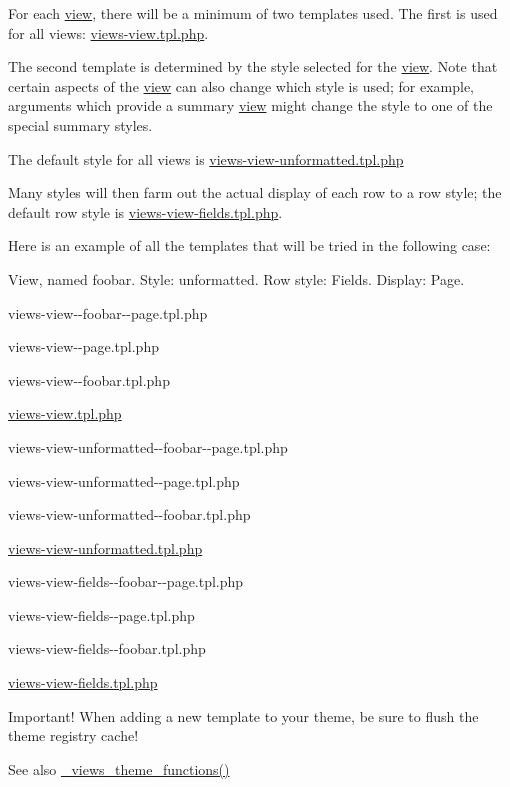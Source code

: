 For each \hyperlink{classview}{view}, there will be a minimum of two templates used. The first is used for all views: \hyperlink{views-view_8tpl_8php}{views-\/view.tpl.php}.

The second template is determined by the style selected for the \hyperlink{classview}{view}. Note that certain aspects of the \hyperlink{classview}{view} can also change which style is used; for example, arguments which provide a summary \hyperlink{classview}{view} might change the style to one of the special summary styles.

The default style for all views is \hyperlink{views-view-unformatted_8tpl_8php}{views-\/view-\/unformatted.tpl.php}

Many styles will then farm out the actual display of each row to a row style; the default row style is \hyperlink{views-view-fields_8tpl_8php}{views-\/view-\/fields.tpl.php}.

Here is an example of all the templates that will be tried in the following case:

View, named foobar. Style: unformatted. Row style: Fields. Display: Page.


\begin{DoxyItemize}
\item views-\/view-\/-\/foobar-\/-\/page.tpl.php
\item views-\/view-\/-\/page.tpl.php
\item views-\/view-\/-\/foobar.tpl.php
\item \hyperlink{views-view_8tpl_8php}{views-\/view.tpl.php}
\end{DoxyItemize}


\begin{DoxyItemize}
\item views-\/view-\/unformatted-\/-\/foobar-\/-\/page.tpl.php
\item views-\/view-\/unformatted-\/-\/page.tpl.php
\item views-\/view-\/unformatted-\/-\/foobar.tpl.php
\item \hyperlink{views-view-unformatted_8tpl_8php}{views-\/view-\/unformatted.tpl.php}
\end{DoxyItemize}


\begin{DoxyItemize}
\item views-\/view-\/fields-\/-\/foobar-\/-\/page.tpl.php
\item views-\/view-\/fields-\/-\/page.tpl.php
\item views-\/view-\/fields-\/-\/foobar.tpl.php
\item \hyperlink{views-view-fields_8tpl_8php}{views-\/view-\/fields.tpl.php}
\end{DoxyItemize}

Important! When adding a new template to your theme, be sure to flush the theme registry cache!

\begin{DoxySeeAlso}{See also}
\hyperlink{views_2theme_2theme_8inc_acf9e7bcb84ebc378f901f483143d0ff0}{\_\-views\_\-theme\_\-functions()} 
\end{DoxySeeAlso}
